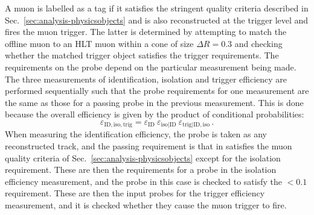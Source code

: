 A muon is labelled as a tag if it satisfies the stringent quality criteria 
described in Sec.~\ref{sec:analysis-physicsobjects} and is also reconstructed 
at the trigger level and fires the muon trigger. The latter is determined by 
attempting to match the 
offline muon to an HLT muon within a cone of size $\Delta R=0.3$ and checking 
whether the matched trigger object satisfies the trigger requirements.
The requirements on the probe depend on the particular measurement being made. 
The three measurements of identification, isolation and trigger efficiency are 
performed sequentially such that the probe requirements for one 
measurement are the same as those for a passing probe in the previous 
measurement. This is done because the overall efficiency is given by the 
product of conditional probabilities:
\begin{equation}
\varepsilon_{\mathrm{ID,iso,trig}} = \varepsilon_{\mathrm{ID}} ~ 
\varepsilon_{\mathrm{iso|ID}} ~ \varepsilon_{\mathrm{trig|ID,iso}} \, .
\label{eqn:muoneff}
\end{equation}
When measuring the identification efficiency, the probe is taken 
as any reconstructed track, and the passing requirement is that in satisfies 
the muon quality criteria of Sec.~\ref{sec:analysis-physicsobjects} except for 
the 
isolation requirement. These are then the requirements for a probe in the 
isolation efficiency measurement, and the probe in this case is checked to 
satisfy the {\reliso$<0.1$} requirement. These are then the input probes for 
the trigger efficiency measurement, and it is checked whether they cause the 
muon trigger to fire.



